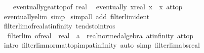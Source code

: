 \begin{isabellebody}
\ \ \isamarkupfalse%
\ eventually{\isacharunderscore}{\kern0pt}ge{\isacharunderscore}{\kern0pt}at{\isacharunderscore}{\kern0pt}top{\isacharbrackleft}{\kern0pt}of\ {\isachardoublequoteopen}{}{\isacharcolon}{\kern0pt}{\isacharcolon}{\kern0pt}real{\isachardoublequoteclose}{\isacharbrackright}{\kern0pt}\ \isamarkupfalse%
\ {\isachardoublequoteopen}eventually\ {\isacharparenleft}{\kern0pt}{\isasymlambda}x{\isacharcolon}{\kern0pt}{\isacharcolon}{\kern0pt}real{\isachardot}{\kern0pt}\ {\isasymbar}x{\isasymbar}\ {\isacharequal}{\kern0pt}\ x{\isacharparenright}{\kern0pt}\ at{\isacharunderscore}{\kern0pt}top{\isachardoublequoteclose}\isanewline
\ \ \ \ \isamarkupfalse%
\ eventually{\isacharunderscore}{\kern0pt}elim\ simp\isanewline
{}\isamarkupfalse%
\ {\isacharparenleft}{\kern0pt}simp{\isacharunderscore}{\kern0pt}all\ add{\isacharcolon}{\kern0pt}\ filterlim{\isacharunderscore}{\kern0pt}ident{\isacharparenright}{\kern0pt}%
\endisatagproof
{\isafoldproof}%
%
\isadelimproof
\isanewline
%
\endisadelimproof
\isanewline
{}\isamarkupfalse%
\ filterlim{\isacharunderscore}{\kern0pt}of{\isacharunderscore}{\kern0pt}real{\isacharunderscore}{\kern0pt}at{\isacharunderscore}{\kern0pt}infinity\ {\isacharbrackleft}{\kern0pt}tendsto{\isacharunderscore}{\kern0pt}intros{\isacharbrackright}{\kern0pt}{\isacharcolon}{\kern0pt}\isanewline
\ \ {\isachardoublequoteopen}filterlim\ {\isacharparenleft}{\kern0pt}of{\isacharunderscore}{\kern0pt}real\ {\isacharcolon}{\kern0pt}{\isacharcolon}{\kern0pt}\ real\ {\isasymRightarrow}\ {\isacharprime}{\kern0pt}a\ {\isacharcolon}{\kern0pt}{\isacharcolon}{\kern0pt}\ real{\isacharunderscore}{\kern0pt}normed{\isacharunderscore}{\kern0pt}algebra{\isacharunderscore}{\kern0pt}{}{\isacharparenright}{\kern0pt}\ at{\isacharunderscore}{\kern0pt}infinity\ at{\isacharunderscore}{\kern0pt}top{\isachardoublequoteclose}\isanewline
%
\isadelimproof
\ \ %
\endisadelimproof
%
\isatagproof
{}\isamarkupfalse%
\ {\isacharparenleft}{\kern0pt}intro\ filterlim{\isacharunderscore}{\kern0pt}norm{\isacharunderscore}{\kern0pt}at{\isacharunderscore}{\kern0pt}top{\isacharunderscore}{\kern0pt}imp{\isacharunderscore}{\kern0pt}at{\isacharunderscore}{\kern0pt}infinity{\isacharparenright}{\kern0pt}\ {\isacharparenleft}{\kern0pt}auto\ simp{\isacharcolon}{\kern0pt}\ filterlim{\isacharunderscore}{\kern0pt}abs{\isacharunderscore}{\kern0pt}real{\isacharparenright}{\kern0pt}%
\endisatagproof
{\isafoldproof}%
%
\isadelimproof
\isanewline
%
\endisadelimproof
\isanewline
{}\isamarkupfalse%

\end{isabellebody}
